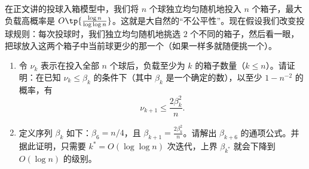 \begin{problem}
在正文讲的投球入箱模型中，我们将 $n$ 个球独立均匀随机地投入 $n$ 个箱子，最大负载高概率是 $O\tp{\frac{\log n}{\log \log n}}$。这就是大自然的“不公平性”。现在假设我们改变投球规则：每次投球时，我们独立均匀随机地挑选 $2$ 个不同的箱子，然后看一眼，把球放入这两个箱子中当前球更少的那一个（如果一样多就随便挑一个）。
\begin{enumerate}
    \item 令 $\nu_k$ 表示在投入全部 $n$ 个球后，负载至少为 $k$ 的箱子数量（$k\le n$）。请证明：在已知 $\nu_k \le \beta_k$ 的条件下（其中 $\beta_k$ 是一个确定的数），以至少 $1 - n^{-2}$ 的概率，有
    \[
        \nu_{k+1} \le \frac{2\beta_k^2}{n}.
    \]
    \item 定义序列 $\beta_k$ 如下：$\beta_6 = n/4$，且 $\beta_{k+1} = \frac{2\beta_k^2}{n}$。请解出 $\beta_{k+6}$ 的通项公式。并据此证明，只需要 $k^* = O(\log \log n)$ 次迭代，上界 $\beta_{k^*}$ 就会下降到 $O(\log n)$ 的级别。
\end{enumerate}
\end{problem}
